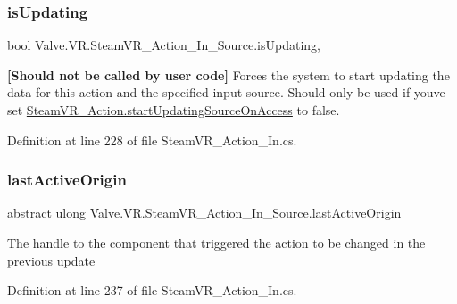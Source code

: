 \subsubsection{\texorpdfstring{isUpdating}{isUpdating}}
{\footnotesize\ttfamily bool Valve.\+V\+R.\+Steam\+V\+R\+\_\+\+Action\+\_\+\+In\+\_\+\+Source.\+is\+Updating\hspace{0.3cm}{\ttfamily [get]}, {\ttfamily [set]}}



{\bfseries{\mbox{[}Should not be called by user code\mbox{]}}} Forces the system to start updating the data for this action and the specified input source. Should only be used if you\textquotesingle{}ve set \mbox{\hyperlink{class_valve_1_1_v_r_1_1_steam_v_r___action_ae27e9858dec18a4307cca7779ed87ad8}{Steam\+V\+R\+\_\+\+Action.\+start\+Updating\+Source\+On\+Access}} to false. 



Definition at line 228 of file Steam\+V\+R\+\_\+\+Action\+\_\+\+In.\+cs.

\mbox{\label{class_valve_1_1_v_r_1_1_steam_v_r___action___in___source_adb2c1b7b1f6678ffcc8a72b544bcc9d1}} 
\subsubsection{\texorpdfstring{lastActiveOrigin}{lastActiveOrigin}}
{\footnotesize\ttfamily abstract ulong Valve.\+V\+R.\+Steam\+V\+R\+\_\+\+Action\+\_\+\+In\+\_\+\+Source.\+last\+Active\+Origin\hspace{0.3cm}{\ttfamily [get]}}



The handle to the component that triggered the action to be changed in the previous update 



Definition at line 237 of file Steam\+V\+R\+\_\+\+Action\+\_\+\+In.\+cs.

\mbox{\label{class_valve_1_1_v_r_1_1_steam_v_r___action___in___source_afdd5358ed142b133681fe61a9bb16d5c}} 
